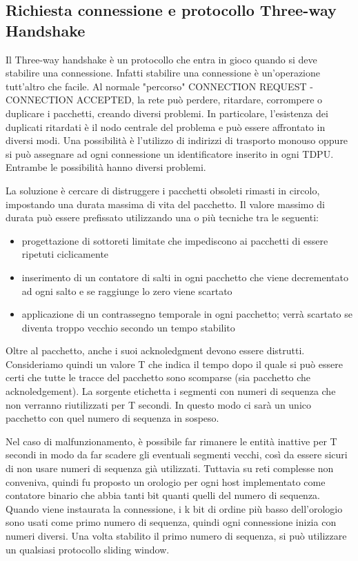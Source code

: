 \subsection{Richiesta connessione e protocollo Three-way Handshake}

Il Three-way handshake è un protocollo che entra in gioco quando si deve stabilire una connessione.
Infatti stabilire una connessione è un'operazione tutt'altro che facile.
Al normale "percorso" CONNECTION REQUEST - CONNECTION ACCEPTED, la rete può perdere, ritardare, corrompere o duplicare i pacchetti, creando diversi problemi.
In particolare, l'esistenza dei duplicati ritardati è il nodo centrale del problema e può essere affrontato in diversi modi.
Una possibilità è l'utilizzo di indirizzi di trasporto monouso oppure si può assegnare ad ogni connessione un identificatore inserito in ogni TDPU.
Entrambe le possibilità hanno diversi problemi.

La soluzione è cercare di distruggere i pacchetti obsoleti rimasti in circolo, impostando una durata massima di vita del pacchetto.
Il valore massimo di durata può essere prefissato utilizzando una o più tecniche tra le seguenti:
\begin{itemize}
\item progettazione di sottoreti limitate che impediscono ai pacchetti di essere ripetuti ciclicamente
\item inserimento di un contatore di salti in ogni pacchetto che viene decrementato ad ogni salto e se raggiunge lo zero viene scartato
\item applicazione di un contrassegno temporale in ogni pacchetto; verrà scartato se diventa troppo vecchio secondo un tempo stabilito
\end{itemize}
Oltre al pacchetto, anche i suoi acknoledgment devono essere distrutti.
Consideriamo quindi un valore T che indica il tempo dopo il quale si può essere certi che tutte le tracce del pacchetto sono scomparse (sia pacchetto che acknoledgement).
La sorgente etichetta i segmenti con numeri di sequenza che non verranno riutilizzati per T secondi.
In questo modo ci sarà un unico pacchetto con quel numero di sequenza in sospeso.

Nel caso di malfunzionamento, è possibile far rimanere le entità inattive per T secondi in modo da far scadere gli eventuali segmenti vecchi, così da essere sicuri di non usare numeri di sequenza già utilizzati.
Tuttavia su reti complesse non conveniva, quindi fu proposto un orologio per ogni host implementato come contatore binario che abbia tanti bit quanti quelli del numero di sequenza.
Quando viene instaurata la connessione, i k bit di ordine più basso dell'orologio sono usati come primo numero di sequenza, quindi ogni connessione inizia con numeri diversi.
Una volta stabilito il primo numero di sequenza, si può utilizzare un qualsiasi protocollo sliding window.

